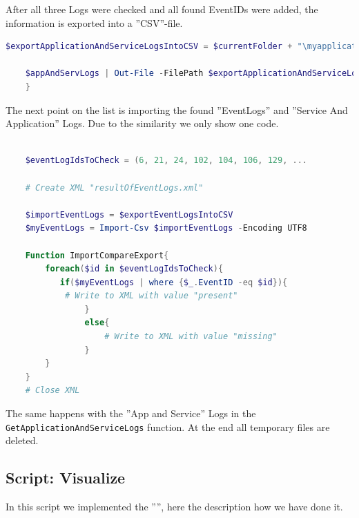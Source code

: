 \clearpage
After all three Logs were checked and all found EventIDs were added, the information is exported into a ''CSV''-file.
\begin{lstlisting}[caption=Function GetApplicationAndServiceLogs Part 2, language=PowerShell]
    $exportApplicationAndServiceLogsIntoCSV = $currentFolder + "\myapplicationandservicelogs.csv"

    $appAndServLogs | Out-File -FilePath $exportApplicationAndServiceLogsIntoCSV
    }
\end{lstlisting}
The next point on the list is importing the found ''EventLogs'' and ''Service And Application'' Logs. Due to the similarity we only show one code.
\begin{lstlisting}[caption=Function ImportCompareExport, language=PowerShell]
    
    $eventLogIdsToCheck = (6, 21, 24, 102, 104, 106, 129, ...

    # Create XML "resultOfEventLogs.xml"

    $importEventLogs = $exportEventLogsIntoCSV
    $myEventLogs = Import-Csv $importEventLogs -Encoding UTF8

    Function ImportCompareExport{
        foreach($id in $eventLogIdsToCheck){
           if($myEventLogs | where {$_.EventID -eq $id}){
            # Write to XML with value "present"
                }
                else{
                    # Write to XML with value "missing"
                }
        }
    }
    # Close XML
\end{lstlisting}
The same happens with the ''App and Service'' Logs in the \lstinline|GetApplicationAndServiceLogs| function. At the end all temporary files are deleted.
\clearpage
\subsection{Script: Visualize}
In this script we implemented the '''', here the description how we have done it.
